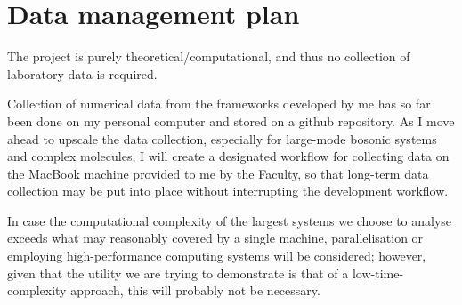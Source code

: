 \documentclass[12pt]{report}
\begin{document}
	\section{Data management plan}
	The project is purely theoretical/computational, and thus no collection of laboratory data is required.
	
	Collection of numerical data from the frameworks developed by me has so far been done on my personal computer and stored on a github repository. As I move ahead to upscale the data collection, especially for large-mode bosonic systems and complex molecules, I will create a designated workflow for collecting data on the MacBook machine provided to me by the Faculty, so that long-term data collection may be put into place without interrupting the development workflow.
	
	In case the computational complexity of the largest systems we choose to analyse exceeds what may reasonably covered by a single machine, parallelisation or employing high-performance computing systems will be considered; however, given that the utility we are trying to demonstrate is that of a low-time-complexity approach, this will probably not be necessary.
	
	
	
\end{document}
